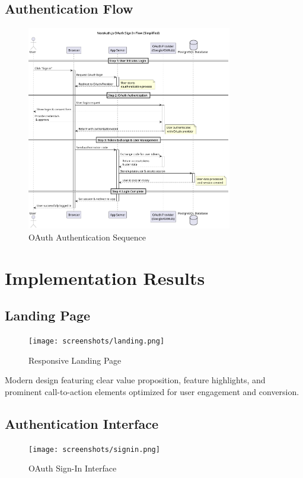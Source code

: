 \subsection{Authentication Flow}
\begin{figure}[H]
    \centering
    \includegraphics[width=0.8\textwidth]{conception/SprintII/sequence_diagrams/sequence_authentication_1_1_AuthenticateUsingGoogleAccount.png}
    \caption{OAuth Authentication Sequence}
    \label{fig:seq_google_auth}
\end{figure}


\section{Implementation Results}

\subsection{Landing Page}
\begin{figure}[H]
    \centering
    \texttt{[image: screenshots/landing.png]}
    \caption{Responsive Landing Page}
    \label{fig:landing_page}
\end{figure}

Modern design featuring clear value proposition, feature highlights, and prominent call-to-action elements optimized for user engagement and conversion.

\subsection{Authentication Interface}
\begin{figure}[H]
    \centering
    \texttt{[image: screenshots/signin.png]}
    \caption{OAuth Sign-In Interface}
    \label{fig:signin_page}
\end{figure}

